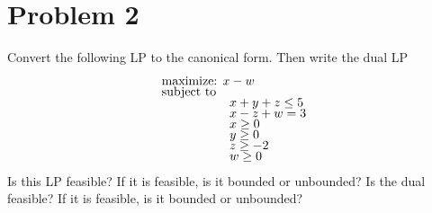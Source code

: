 \section{Problem 2}
Convert the following LP to the canonical form. Then write the dual LP
\begin{align*}
    &\text{maximize: } x - w            \\[-1.5ex]
    &\text{subject to}                  \\[-1.5ex]
    & \hspace{19mm} x + y + z \leq 5    \\[-1.5ex]
    & \hspace{19mm} x - z + w = 3       \\[-1.5ex]
    & \hspace{19mm} x \geq 0            \\[-1.5ex]
    & \hspace{19mm} y \geq 0            \\[-1.5ex]
    & \hspace{19mm} z \geq -2           \\[-1.5ex]
    & \hspace{19mm} w \geq 0
\end{align*}
Is this LP feasible? If it is feasible, is it bounded or unbounded? Is the dual feasible? If it is feasible, is it bounded or unbounded?
\partbreak
